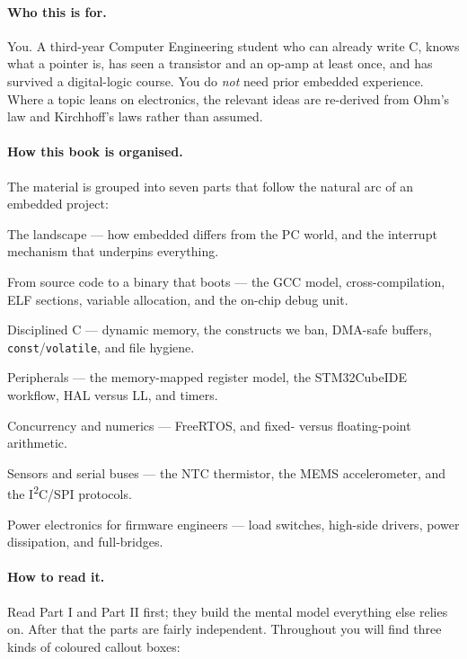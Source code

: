 \documentclass[11pt,a4paper,oneside]{book}
\newcommand{\code}[1]{\texttt{#1}}
\begin{document}
\paragraph{Who this is for.}
You. A third-year Computer Engineering student who can already write C, knows
what a pointer is, has seen a transistor and an op-amp at least once, and has
survived a digital-logic course. You do \emph{not} need prior embedded
experience. Where a topic leans on electronics, the relevant ideas are
re-derived from Ohm's law and Kirchhoff's laws rather than assumed.

\paragraph{How this book is organised.}
The material is grouped into seven parts that follow the natural arc of an
embedded project:
\begin{description}[leftmargin=1.4cm,style=nextline]
  \item[Part I] The landscape --- how embedded differs from the PC world,
        and the interrupt mechanism that underpins everything.
  \item[Part II] From source code to a binary that boots --- the GCC model,
        cross-compilation, ELF sections, variable allocation, and the on-chip
        debug unit.
  \item[Part III] Disciplined C --- dynamic memory, the constructs we ban,
        DMA-safe buffers, \code{const}/\code{volatile}, and file hygiene.
  \item[Part IV] Peripherals --- the memory-mapped register model, the
        STM32CubeIDE workflow, HAL versus LL, and timers.
  \item[Part V] Concurrency and numerics --- FreeRTOS, and fixed- versus
        floating-point arithmetic.
  \item[Part VI] Sensors and serial buses --- the NTC thermistor, the MEMS
        accelerometer, and the I\textsuperscript{2}C/SPI protocols.
  \item[Part VII] Power electronics for firmware engineers --- load switches,
        high-side drivers, power dissipation, and full-bridges.
\end{description}

\paragraph{How to read it.}
Read Part I and Part II first; they build the mental model everything else
relies on. After that the parts are fairly independent. Throughout you will
find three kinds of coloured callout boxes:
\end{document}

